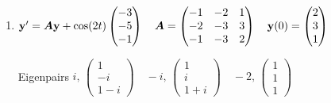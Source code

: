\documentclass[12pt,letterpaper]{article}
\newcommand{\mat}[1]{\bm{#1}}
\begin{document}
\begin{enumerate}
\item
\begingroup\setlength{\arraycolsep}{3pt}
$\vect{y}'=\mat{A}\vect{y}+\cos(2t)\begin{pmatrix}-3\\-5\\-1\end{pmatrix}\quad \mat{A}=\begin{pmatrix}-1&-2&1\\-2&-3&3\\-1&-3&2\end{pmatrix}\quad \vect{y}(0)=\begin{pmatrix}2\\3\\1\end{pmatrix}$
\par Eigenpairs $i,\,\begin{pmatrix}1\\-i\\1-i\end{pmatrix}\quad -i,\,\begin{pmatrix}1\\i\\1+i\end{pmatrix}\quad -2,\,\begin{pmatrix}1\\1\\1\end{pmatrix}$
\endgroup



\end{enumerate}
\end{document}
